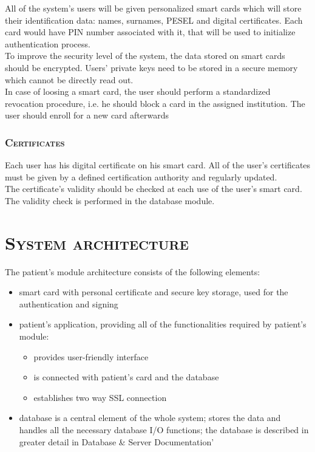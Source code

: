 \documentclass[12pt,titlepage]{article}
\begin{document}
All of the system's users will be given personalized smart cards which will store their identification data: names, surnames, PESEL and digital certificates. 
Each card would have PIN number associated with it, that will be used to initialize authentication process.
\\

To improve the security level of the system, the data stored on smart cards should be encrypted. 
Users' private keys need to be stored in a secure memory which cannot be directly read out.
\\

In case of loosing a smart card, the user should perform a standardized revocation procedure, i.e. he should block a card in the assigned institution. 
The user should enroll for a new card afterwards

\subsubsection{\textsc{Certificates}}
Each user has his digital certificate on his smart card. 
All of the user's certificates must be given by a defined certification authority and regularly updated.
\\

The certificate's validity should be checked at each use of the user's smart card.
The validity check is performed in the database module.

\newpage

\section{\textsc{System architecture}}
The patient's module architecture consists of the following elements:
\begin{itemize}
\item smart card with personal certificate and secure key storage, used for the authentication and signing
\item patient's application, providing all of the functionalities required by patient's module:
\begin{itemize}
\item provides user-friendly interface
\item is connected with patient's card and the database
\item establishes two way SSL connection	
\end{itemize}
\item database is a central element of the whole system; stores the data and handles all the necessary database I/O functions; the database is described in greater detail in Database \& Server Documentation'
\end{itemize}
\end{document}
